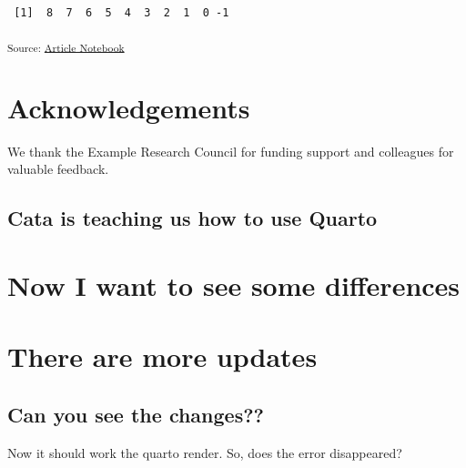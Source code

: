 \documentclass[
  authoryear,
  5p,
  twocolumn]{elsarticle}
\begin{document}
\begin{verbatim}
 [1]  8  7  6  5  4  3  2  1  0 -1
\end{verbatim}

\textsubscript{Source:
\href{https://afuenteshinojosa.github.io/test-paper/index.qmd.html}{Article
Notebook}}

\section*{Acknowledgements}\label{acknowledgements}

We thank the Example Research Council for funding support and colleagues
for valuable feedback.

\subsection{Cata is teaching us how to use
Quarto}\label{cata-is-teaching-us-how-to-use-quarto}

\section{Now I want to see some
differences}\label{now-i-want-to-see-some-differences}

\section{There are more updates}\label{there-are-more-updates}

\subsection{Can you see the changes??}\label{can-you-see-the-changes}

Now it should work the quarto render. So, does the error disappeared?



\end{document}
